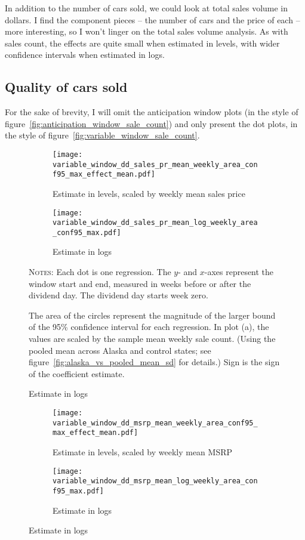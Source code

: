 \documentclass[11pt,letterpaper,oneside]{article}
\newcommand{\varWindowDDnotes}{%
Each dot is one regression.
The $y$- and $x$-axes represent the window start and end, measured in weeks before or after the dividend day.
The dividend day starts week zero.

 The area of the circles represent the magnitude of the larger bound of the 95\% confidence interval for each regression.
In plot (a), the values are scaled by the sample mean weekly sale count.
(Using the pooled mean across Alaska and control states; see figure~\ref{fig:alaska_vs_pooled_mean_sd} for details.)
Sign is the sign of the coefficient estimate. %
}
\begin{document}
\begin{doublespacing}
In addition to the number of cars sold, we could look at total sales volume in dollars.
I find the component pieces -- the number of cars and the price of each -- more interesting, so I won't linger on the total sales volume analysis.
As with sales count, the effects are quite small when estimated in levels, with wider confidence intervals when estimated in logs.

\subsection{Quality of cars sold}



For the sake of brevity, I will omit the anticipation window plots (in the style of figure~\ref{fig:anticipation_window_sale_count}) and only present the dot plots, in the style of figure~\ref{fig:variable_window_sale_count}.
\begin{figure}[!hbtp]
    \caption{Sales price effects with varying windows}
    \begin{subfigure}{0.97\linewidth}
        \caption{Estimate in levels, scaled by weekly mean sales price}
        \texttt{[image: variable\_window\_dd\_sales\_pr\_mean\_weekly\_area\_conf95\_max\_effect\_mean.pdf]}
    \end{subfigure}
    \begin{subfigure}{0.97\linewidth}
        \caption{Estimate in logs}
        \texttt{[image: variable\_window\_dd\_sales\_pr\_mean\_log\_weekly\_area\_conf95\_max.pdf]}
    \end{subfigure}

    {\footnotesize
    \textsc{Notes:}
    \varWindowDDnotes
    }
\end{figure}

\begin{figure}[!hbtp]
    \caption{MSRP effects with varying windows}
    \begin{subfigure}{0.97\linewidth}
        \caption{Estimate in levels, scaled by weekly mean MSRP}
        \texttt{[image: variable\_window\_dd\_msrp\_mean\_weekly\_area\_conf95\_max\_effect\_mean.pdf]}
    \end{subfigure}
    \begin{subfigure}{0.97\linewidth}
        \caption{Estimate in logs}
        \texttt{[image: variable\_window\_dd\_msrp\_mean\_log\_weekly\_area\_conf95\_max.pdf]}
    \end{subfigure}


\end{figure}
\end{doublespacing}
\end{document}
